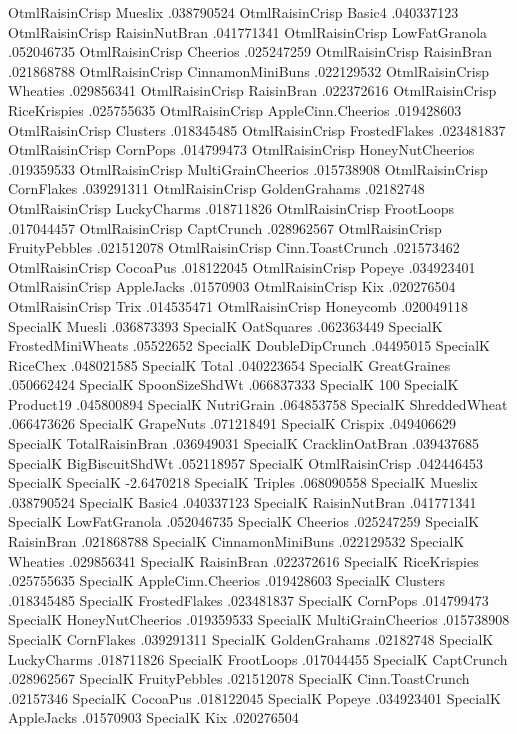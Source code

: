 OtmlRaisinCrisp	Mueslix	.038790524
OtmlRaisinCrisp	Basic4	.040337123
OtmlRaisinCrisp	RaisinNutBran	.041771341
OtmlRaisinCrisp	LowFatGranola	.052046735
OtmlRaisinCrisp	Cheerios	.025247259
OtmlRaisinCrisp	RaisinBran	.021868788
OtmlRaisinCrisp	CinnamonMiniBuns	.022129532
OtmlRaisinCrisp	Wheaties	.029856341
OtmlRaisinCrisp	RaisinBran	.022372616
OtmlRaisinCrisp	RiceKrispies	.025755635
OtmlRaisinCrisp	AppleCinn.Cheerios	.019428603
OtmlRaisinCrisp	Clusters	.018345485
OtmlRaisinCrisp	FrostedFlakes	.023481837
OtmlRaisinCrisp	CornPops	.014799473
OtmlRaisinCrisp	HoneyNutCheerios	.019359533
OtmlRaisinCrisp	MultiGrainCheerios	.015738908
OtmlRaisinCrisp	CornFlakes	.039291311
OtmlRaisinCrisp	GoldenGrahams	.02182748
OtmlRaisinCrisp	LuckyCharms	.018711826
OtmlRaisinCrisp	FrootLoops	.017044457
OtmlRaisinCrisp	CaptCrunch	.028962567
OtmlRaisinCrisp	FruityPebbles	.021512078
OtmlRaisinCrisp	Cinn.ToastCrunch	.021573462
OtmlRaisinCrisp	CocoaPus	.018122045
OtmlRaisinCrisp	Popeye	.034923401
OtmlRaisinCrisp	AppleJacks	.01570903
OtmlRaisinCrisp	Kix	.020276504
OtmlRaisinCrisp	Trix	.014535471
OtmlRaisinCrisp	Honeycomb	.020049118
SpecialK	Muesli	.036873393
SpecialK	OatSquares	.062363449
SpecialK	FrostedMiniWheats	.05522652
SpecialK	DoubleDipCrunch	.04495015
SpecialK	RiceChex	.048021585
SpecialK	Total	.040223654
SpecialK	GreatGraines	.050662424
SpecialK	SpoonSizeShdWt	.066837333
SpecialK	100%
SpecialK	Product19	.045800894
SpecialK	NutriGrain	.064853758
SpecialK	ShreddedWheat	.066473626
SpecialK	GrapeNuts	.071218491
SpecialK	Crispix	.049406629
SpecialK	TotalRaisinBran	.036949031
SpecialK	CracklinOatBran	.039437685
SpecialK	BigBiscuitShdWt	.052118957
SpecialK	OtmlRaisinCrisp	.042446453
SpecialK	SpecialK	-2.6470218
SpecialK	Triples	.068090558
SpecialK	Mueslix	.038790524
SpecialK	Basic4	.040337123
SpecialK	RaisinNutBran	.041771341
SpecialK	LowFatGranola	.052046735
SpecialK	Cheerios	.025247259
SpecialK	RaisinBran	.021868788
SpecialK	CinnamonMiniBuns	.022129532
SpecialK	Wheaties	.029856341
SpecialK	RaisinBran	.022372616
SpecialK	RiceKrispies	.025755635
SpecialK	AppleCinn.Cheerios	.019428603
SpecialK	Clusters	.018345485
SpecialK	FrostedFlakes	.023481837
SpecialK	CornPops	.014799473
SpecialK	HoneyNutCheerios	.019359533
SpecialK	MultiGrainCheerios	.015738908
SpecialK	CornFlakes	.039291311
SpecialK	GoldenGrahams	.02182748
SpecialK	LuckyCharms	.018711826
SpecialK	FrootLoops	.017044455
SpecialK	CaptCrunch	.028962567
SpecialK	FruityPebbles	.021512078
SpecialK	Cinn.ToastCrunch	.02157346
SpecialK	CocoaPus	.018122045
SpecialK	Popeye	.034923401
SpecialK	AppleJacks	.01570903
SpecialK	Kix	.020276504

